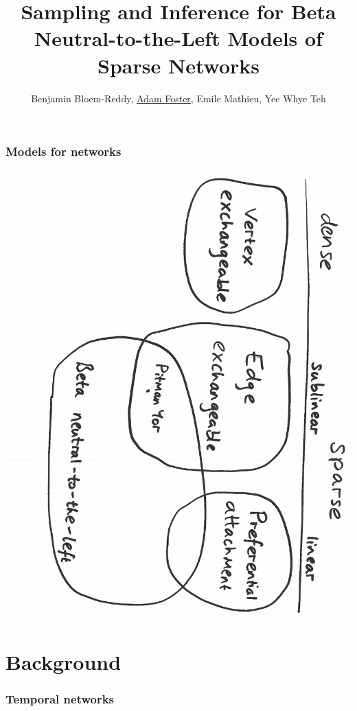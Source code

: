 \documentclass[final,hyperref={pdfpagelabels=false},noamsthm]{beamer}
\title{Sampling and Inference for Beta Neutral-to-the-Left Models of Sparse Networks} %
\author{Benjamin Bloem-Reddy, \underline{Adam Foster}, Emile Mathieu, Yee Whye Teh }
\institute{Department of Statistics, University of Oxford}
\begin{document}
	
\begin{frame}[plain]
	\titlepage
\end{frame}


\begin{frame}
	\frametitle{Models for networks}
	\includegraphics[angle=90,origin=c,scale=0.4]{fig/models6}
\end{frame}

\section{Background}
\begin{frame}
	\frametitle{Temporal networks}
	\begin{center}
	\end{center}
\end{frame}
\end{document}
